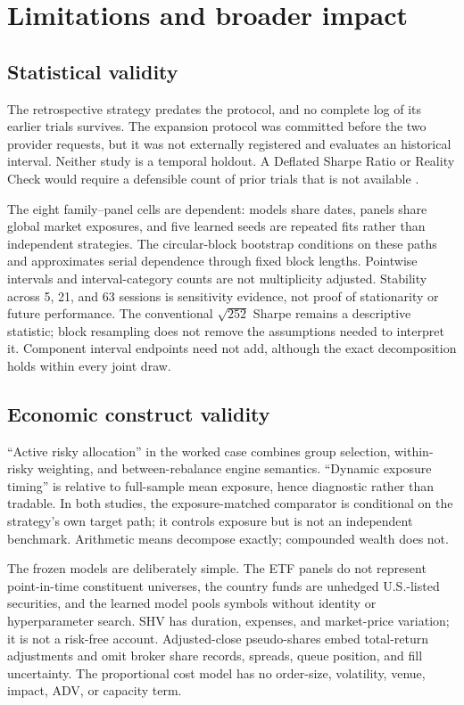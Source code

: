 \documentclass{article}
\begin{document}
\section{Limitations and broader impact}

\subsection{Statistical validity}

The retrospective strategy predates the protocol, and no complete log of its
earlier trials survives. The expansion protocol was committed before the two
provider requests, but it was not externally registered and evaluates an
historical interval. Neither study is a temporal holdout. A Deflated Sharpe
Ratio or Reality Check would require a defensible count of prior trials that is
not available \citep{white2000reality,bailey2014deflated}.

The eight family--panel cells are dependent: models share dates, panels share
global market exposures, and five learned seeds are repeated fits rather than
independent strategies. The circular-block bootstrap conditions on these paths
and approximates serial dependence through fixed block lengths. Pointwise
intervals and interval-category counts are not multiplicity adjusted. Stability
across 5, 21, and 63 sessions is sensitivity evidence, not proof of stationarity
or future performance. The conventional $\sqrt{252}$ Sharpe remains a
descriptive statistic; block resampling does not remove the assumptions needed
to interpret it. Component interval endpoints need not add, although the exact
decomposition holds within every joint draw.

\subsection{Economic construct validity}

``Active risky allocation'' in the worked case combines group selection,
within-risky weighting, and between-rebalance engine semantics. ``Dynamic
exposure timing'' is relative to full-sample mean exposure, hence diagnostic
rather than tradable. In both studies, the exposure-matched comparator is
conditional on the strategy's own target path; it controls exposure but is not
an independent benchmark. Arithmetic means decompose exactly; compounded
wealth does not.

The frozen models are deliberately simple. The ETF panels do not represent
point-in-time constituent universes, the country funds are unhedged U.S.-listed
securities, and the learned model pools symbols without identity or
hyperparameter search. SHV has duration, expenses, and market-price variation;
it is not a risk-free account. Adjusted-close pseudo-shares embed total-return
adjustments and omit broker share records, spreads, queue position, and fill
uncertainty. The proportional cost model has no order-size, volatility, venue,
impact, ADV, or capacity term.
\end{document}
